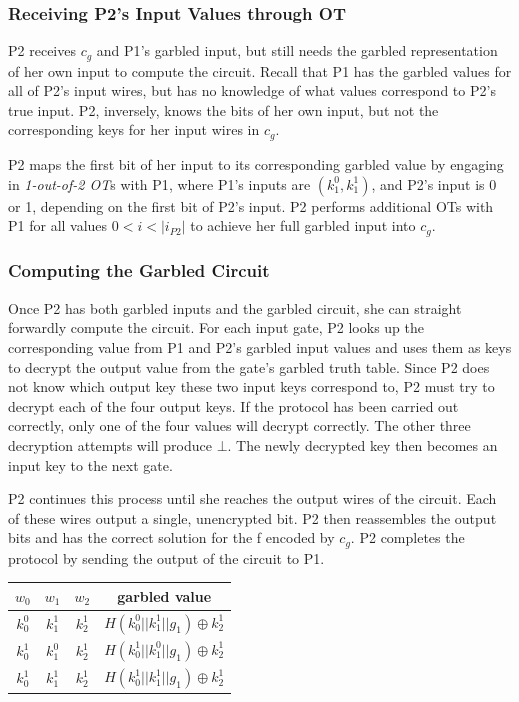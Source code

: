 \subsubsection{Receiving \ac{P2}'s Input Values through \ac{OT}}

\ac{P2} receives $c_g$ and \ac{P1}'s garbled input, but still needs the garbled representation of her own input to compute the circuit. Recall that \ac{P1} has the garbled values for all of \ac{P2}'s input wires, but has no knowledge of what values correspond to \ac{P2}'s true input. \ac{P2}, inversely, knows the bits of her own input, but not the corresponding keys for her input wires in $c_g$.

\ac{P2} maps the first bit of her input to its corresponding garbled value by engaging in \emph{1-out-of-2 \ac{OT}}s with \ac{P1}, where \ac{P1}'s inputs are $(k^0_1, k^1_1)$, and \ac{P2}'s input is 0 or 1, depending on the first bit of \ac{P2}'s input.  \ac{P2} performs additional \ac{OT}s with \ac{P1} for all values $0 < i < |i_{P2}|$ to achieve her full garbled input into $c_g$.

\subsubsection{Computing the Garbled Circuit}

Once \ac{P2} has both garbled inputs and the garbled circuit, she can straight forwardly compute the circuit.  For each input gate, \ac{P2} looks up the corresponding value from \ac{P1} and \ac{P2}'s garbled input values and uses them as keys to decrypt the output value from the gate's garbled truth table.  Since \ac{P2} does not know which output key these two input keys correspond to, \ac{P2} must try to decrypt each of the four output keys.  If the protocol has been carried out correctly, only one of the four values will decrypt correctly.  The other three decryption attempts will produce $\bot$. The newly decrypted key then becomes an input key to the next gate.

\ac{P2} continues this process until she reaches the output wires of the circuit.  Each of these wires output a single, unencrypted bit.  \ac{P2} then reassembles the output bits and has the correct solution for the \ac{f} encoded by $c_g$.  \ac{P2} completes the protocol by sending the output of the circuit to \ac{P1}.

\begin{tabular}{ c | c || c || c }
    \hline
    $w_0$ & $w_1$ & $w_2$ & garbled value \\
    \hline

    \hline
    $k^0_0$ & $k^1_1$ & $k^1_2$ & $H(k^0_0 || k^1_1 || g_1) \oplus k^1_2$\\
    \hline
    $k^1_0$ & $k^0_1$ & $k^1_2$ & $H(k^1_0 || k^0_1 || g_1) \oplus k^1_2$\\
    \hline
    $k^1_0$ & $k^1_1$ & $k^1_2$ & $H(k^1_0 || k^1_1 || g_1) \oplus k^1_2$\\
    \hline
\end{tabular}



